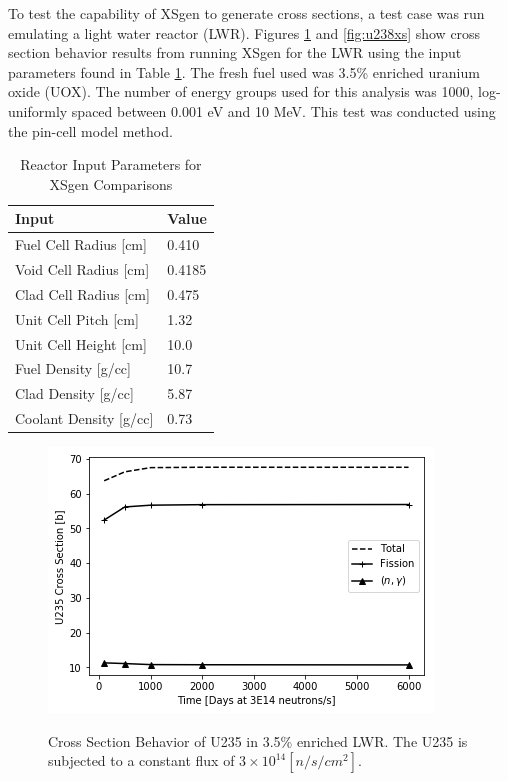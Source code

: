 \documentclass{article}
\begin{document}
To test the capability of XSgen to generate cross sections, a test case was run emulating a light water reactor (LWR). 
Figures \ref{fig:u235xs} and \ref{fig:u238xs} show cross section behavior results
from running XSgen for the LWR using the input parameters found in
Table \ref{tab:xsgenstats1}. The fresh fuel used was 3.5\% enriched uranium oxide (UOX).
The number of energy groups used for this analysis was 1000, log-uniformly spaced between
0.001 eV and 10 MeV. This test was conducted using the pin-cell model method\cite{pin-cell}. 

\begin{table}[!htb]
\centering
\caption{Reactor Input Parameters for XSgen Comparisons}
\label{tab:xsgenstats1}
\begin{tabular}{ll}
Input & Value \\
\hline
Fuel Cell Radius [cm] & 0.410 \\
Void Cell Radius [cm] & 0.4185 \\
Clad Cell Radius [cm] & 0.475 \\
Unit Cell Pitch  [cm] & 1.32 \\
Unit Cell Height [cm] & 10.0 \\
Fuel Density [g/cc] & 10.7 \\
Clad Density [g/cc] & 5.87 \\
Coolant Density [g/cc] & 0.73 \\
\end{tabular}
\end{table}

\begin{figure}
\caption{Cross Section Behavior of U235 in 3.5\% enriched LWR.
         The U235 is subjected to a constant flux of $3\times10^{14}[n/s/cm^2]$.}
\includegraphics[scale=0.8]{U235xs.png}
\label{fig:u235xs}
\end{figure}
\end{document}
